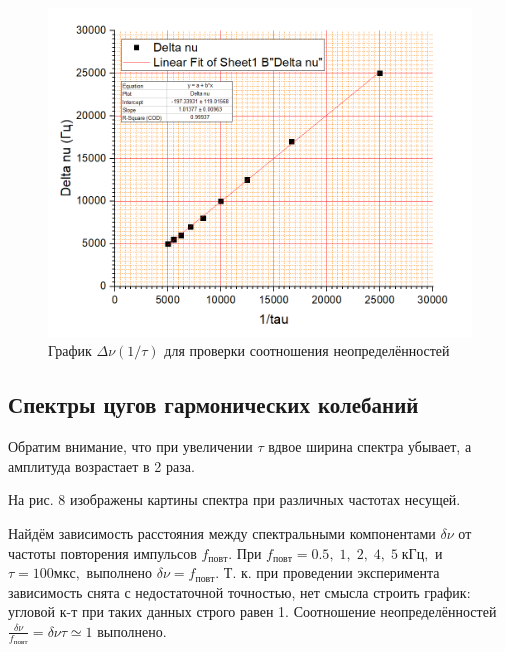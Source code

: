 \documentclass[a4paper]{article}
\begin{document}
\begin{figure}[tb]
	\centering
	\includegraphics[width=0.8\linewidth]{неопр}
	\caption{График $\Delta \nu (1/\tau)$ для проверки соотношения неопределённостей}
	\label{fig:неопр}
\end{figure}

\subsection{Спектры цугов гармонических  колебаний}

Обратим внимание, что  при увеличении $ \tau $ вдвое ширина спектра убывает, а амплитуда возрастает в 2 раза.

На рис. 8 изображены картины спектра при различных частотах несущей.

Найдём зависимость расстояния между спектральными компонентами $ \delta \nu $ от частоты повторения импульсов $ f_{повт} $. При $f_{повт}  = 0.5, \; 1, \; 2, \; 4, \; 5\; кГц, $ и $ \tau = 100 мкс,  $ выполнено $ \delta \nu = f_{повт}$. Т. к. при проведении эксперимента зависимость снята с недостаточной точностью, нет смысла строить график: угловой к-т при таких данных строго равен 1. Соотношение неопределённостей $ \frac{\delta \nu }{f_{повт}} = \delta \nu \tau  \simeq 1$ выполнено.
\end{document}
